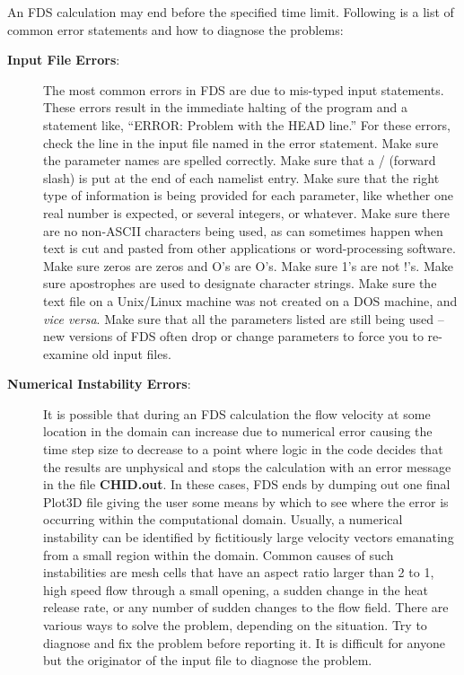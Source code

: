 \documentclass[11pt]{book}
\begin{document}
An FDS calculation may end before the specified time limit.
Following is a list of common error statements and how to diagnose the problems:
\begin{description}
\item[{\bf Input File Errors}:]
The most common errors in FDS are due to mis-typed input statements.
These errors result in the immediate halting of the program and a statement like, ``ERROR: Problem
with the HEAD line.'' For these errors, check the line in the input file named in the error statement.
Make sure the parameter names are spelled correctly. Make sure that a / (forward slash)
is put at the end of each namelist entry. Make sure that the right type of information is
being provided for each parameter, like whether one real number is expected, or several integers, or
whatever. Make sure there are no non-ASCII characters being used, as can sometimes happen when text is
cut and pasted from other applications or word-processing software. Make sure zeros are zeros and
O's are O's. Make sure 1's are not !'s. Make sure apostrophes are used to designate character strings.
Make sure the text file on a Unix/Linux machine was not created on a DOS machine, and {\em vice versa}.
Make sure that all the parameters listed are still being used -- new versions of FDS often drop or
change parameters to force you to re-examine old input files.

\item [{\bf Numerical Instability Errors}:]
It is possible that during an FDS calculation the flow
velocity at some location in the domain can increase due to numerical error causing the time step
size to decrease to a point where logic in the code decides that the results are unphysical
and stops the calculation with an error message in the file {\bf CHID.out}.
In these cases, FDS ends by dumping out one final
Plot3D file giving the user some means by which to see where the
error is occurring within the computational domain. Usually, a numerical
instability can be identified by fictitiously large velocity vectors emanating from
a small region within the domain. Common causes of such instabilities are
mesh cells that have an aspect ratio larger than 2 to 1, high speed flow through a small
opening, a sudden change in the heat release rate, or any number of sudden changes to the
flow field. There are various ways to solve the problem, depending on the situation.
Try to diagnose and fix the problem before reporting it. It is difficult
for anyone but the originator of the input file to diagnose the problem.


\end{description}
\end{document}
